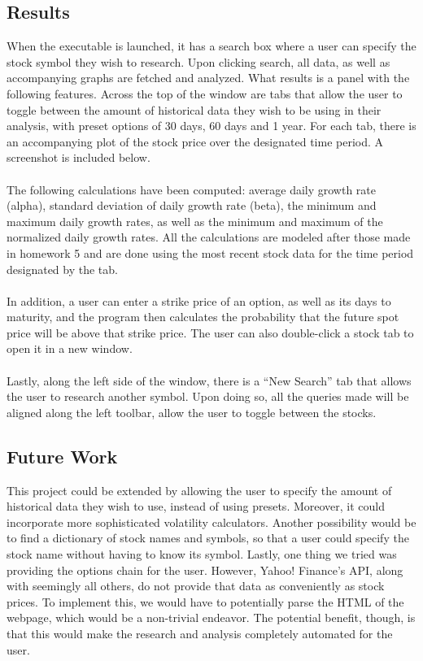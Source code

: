 \documentclass[pdftex,12pt]{article}
\theoremstyle{definition}
\theoremstyle{remark}
\begin{document}
\subsection*{Results}
When the executable is launched, it has a search box where a user can specify the stock symbol they wish to research. Upon clicking search, all data, as well as accompanying graphs are fetched and analyzed. What results is a panel with the following features. Across the top of the window are tabs that allow the user to toggle between the amount of historical data they wish to be using in their analysis, with preset options of 30 days, 60 days and 1 year. For each tab, there is an accompanying plot of the stock price over the designated time period. A screenshot is included below.\\ \\
The following calculations have been computed: average daily growth rate (alpha), standard deviation of daily growth rate (beta), the minimum and maximum daily growth rates, as well as the minimum and maximum of the normalized daily growth rates. All the calculations are modeled after those made in homework 5 and are done using the most recent stock data for the time period designated by the tab.\\ \\
In addition, a user can enter a strike price of an option, as well as its days to maturity, and the program then calculates the probability that the future spot price will be above that strike price. The user can also double-click a stock tab to open it in a new window.\\ \\
Lastly, along the left side of the window, there is a ``New Search'' tab that allows the user to research another symbol. Upon doing so, all the queries made will be aligned along the left toolbar, allow the user to toggle between the stocks.
\subsection*{Future Work}
This project could be extended by allowing the user to specify the amount of historical data they wish to use, instead of using presets. Moreover, it could incorporate more sophisticated volatility calculators. Another possibility would be to find a dictionary of stock names and symbols, so that a user could specify the stock name without having to know its symbol. Lastly, one thing we tried was providing the options chain for the user. However, Yahoo! Finance's API, along with seemingly all others, do not provide that data as conveniently as stock prices. To implement this, we would have to potentially parse the HTML of the webpage, which would be a non-trivial endeavor. The potential benefit, though, is that this would make the research and analysis completely automated for the user.
\end{document}
